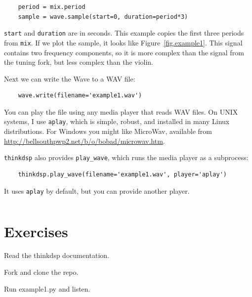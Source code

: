 \documentclass[12pt]{book}
\begin{document}
\begin{verbatim}
    period = mix.period
    sample = wave.sample(start=0, duration=period*3)
\end{verbatim}

{\tt start} and {\tt duration} are in seconds.  This example copies
the first three periods from {\tt mix}.  If we plot the sample, it
looks like Figure~\ref{fig.example1}.  This signal contains two
frequency components, so it is more complex than the signal from the
tuning fork, but less complex than the violin.

Next we can write the Wave to a WAV file:

\begin{verbatim}
    wave.write(filename='example1.wav')
\end{verbatim}

You can play the file using any media player that reads WAV files.  On
UNIX systems, I use {\tt aplay}, which is simple, robust, and
installed in many Linux distributions.  For Windows you might like
MicroWav, available from
\url{http://bellsouthpwp2.net/b/o/bobad/microwav.htm}.

{\tt thinkdsp} also provides \verb"play_wave", which runs
the media player as a subprocess:

\begin{verbatim}
    thinkdsp.play_wave(filename='example1.wav', player='aplay')
\end{verbatim}

It uses {\tt aplay} by default, but you can provide another player.



\begin{verbatim}
\end{verbatim}


\section{Exercises}

\begin{exercise}
Read the thinkdsp documentation.
\end{exercise}

\begin{exercise}
Fork and clone the repo.
\end{exercise}

\begin{exercise}
Run example1.py and listen.
\end{exercise}
\end{document}
